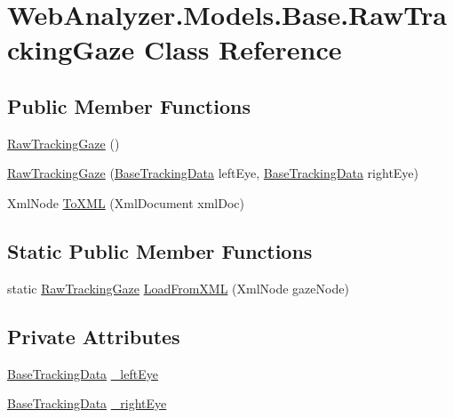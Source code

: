 \hypertarget{class_web_analyzer_1_1_models_1_1_base_1_1_raw_tracking_gaze}{}\section{Web\+Analyzer.\+Models.\+Base.\+Raw\+Tracking\+Gaze Class Reference}
\label{class_web_analyzer_1_1_models_1_1_base_1_1_raw_tracking_gaze}
\subsection*{Public Member Functions}
\begin{DoxyCompactItemize}
\item 
\hyperlink{class_web_analyzer_1_1_models_1_1_base_1_1_raw_tracking_gaze_a5fa23875741ccd08b26a5b66721f3822}{Raw\+Tracking\+Gaze} ()
\item 
\hyperlink{class_web_analyzer_1_1_models_1_1_base_1_1_raw_tracking_gaze_aa36c796e4cea747e212c785a2cddd08f}{Raw\+Tracking\+Gaze} (\hyperlink{class_web_analyzer_1_1_models_1_1_base_1_1_base_tracking_data}{Base\+Tracking\+Data} left\+Eye, \hyperlink{class_web_analyzer_1_1_models_1_1_base_1_1_base_tracking_data}{Base\+Tracking\+Data} right\+Eye)
\item 
Xml\+Node \hyperlink{class_web_analyzer_1_1_models_1_1_base_1_1_raw_tracking_gaze_a0de790ba2edb091bde241007be981427}{To\+X\+M\+L} (Xml\+Document xml\+Doc)
\end{DoxyCompactItemize}
\subsection*{Static Public Member Functions}
\begin{DoxyCompactItemize}
\item 
static \hyperlink{class_web_analyzer_1_1_models_1_1_base_1_1_raw_tracking_gaze}{Raw\+Tracking\+Gaze} \hyperlink{class_web_analyzer_1_1_models_1_1_base_1_1_raw_tracking_gaze_a2a7621cda0221f638008c67561d17f3a}{Load\+From\+X\+M\+L} (Xml\+Node gaze\+Node)
\end{DoxyCompactItemize}
\subsection*{Private Attributes}
\begin{DoxyCompactItemize}
\item 
\hyperlink{class_web_analyzer_1_1_models_1_1_base_1_1_base_tracking_data}{Base\+Tracking\+Data} \hyperlink{class_web_analyzer_1_1_models_1_1_base_1_1_raw_tracking_gaze_a50d308230da6fdb235fa19273a8264da}{\+\_\+left\+Eye}
\item 
\hyperlink{class_web_analyzer_1_1_models_1_1_base_1_1_base_tracking_data}{Base\+Tracking\+Data} \hyperlink{class_web_analyzer_1_1_models_1_1_base_1_1_raw_tracking_gaze_abd10432d6263254b7ebefe31ade87131}{\+\_\+right\+Eye}
\end{DoxyCompactItemize}


